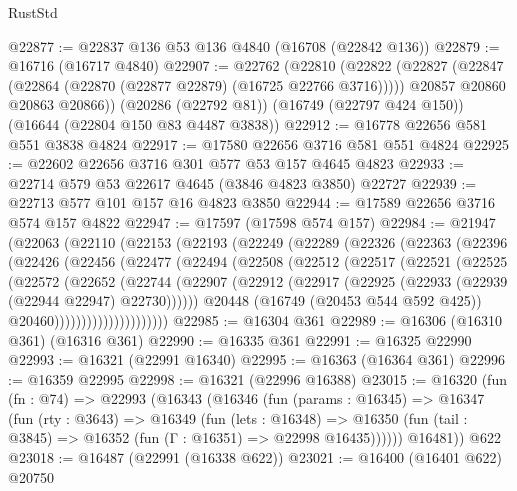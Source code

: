 \begin{lexlean}{RustStd}
\begin{coremodule}
@22877 := @22837 @136 @53 @136 @4840 (@16708 (@22842 @136))
@22879 := @16716 (@16717 @4840)
@22907 := @22762
    (@22810
      (@22822
        (@22827 (@22847 (@22864 (@22870 (@22877 @22879) (@16725 @22766 @3716)))))
        @20857
        @20860
        @20863
        @20866))
    (@20286 (@22792 @81))
    (@16749 (@22797 @424 @150))
    (@16644 (@22804 @150 @83 @4487 @3838))
@22912 := @16778 @22656 @581 @551 @3838 @4824
@22917 := @17580 @22656 @3716 @581 @551 @4824
@22925 := @22602 @22656 @3716 @301 @577 @53 @157 @4645 @4823
@22933 := @22714 @579 @53 @22617 @4645 (@3846 @4823 @3850) @22727
@22939 := @22713 @577 @101 @157 @16 @4823 @3850
@22944 := @17589 @22656 @3716 @574 @157 @4822
@22947 := @17597 (@17598 @574 @157)
@22984 := @21947
    (@22063
      (@22110
        (@22153
          (@22193
            (@22249
              (@22289
                (@22326
                  (@22363
                    (@22396
                      (@22426
                        (@22456
                          (@22477
                            (@22494
                              (@22508
                                (@22512
                                  (@22517
                                    (@22521
                                      (@22525
                                        (@22572
                                          (@22652
                                            (@22744
                                              (@22907
                                                (@22912
                                                  (@22917
                                                    (@22925
                                                      (@22933 (@22939 (@22944 @22947) @22730))))))
                                              @20448
                                              (@16749 (@20453 @544 @592 @425))
                                              @20460)))))))))))))))))))))
@22985 := @16304 @361
@22989 := @16306 (@16310 @361) (@16316 @361)
@22990 := @16335 @361
@22991 := @16325 @22990
@22993 := @16321 (@22991 @16340)
@22995 := @16363 (@16364 @361)
@22996 := @16359 @22995
@22998 := @16321 (@22996 @16388)
@23015 := @16320
    (fun (fn : @74) =>
    @22993
      (@16343
        (@16346
          (fun (params : @16345) =>
          @16347
            (fun (rty : @3643) =>
            @16349
              (fun (lets : @16348) =>
              @16350 (fun (tail : @3845) => @16352 (fun (Γ : @16351) => @22998 @16435))))))
        @16481))
    @622
@23018 := @16487 (@22991 (@16338 @622))
@23021 := @16400 (@16401 @622) @20750

\end{coremodule}
\end{lexlean}
